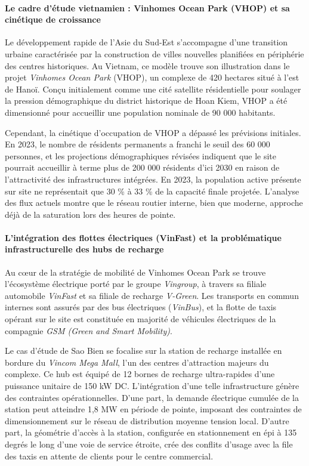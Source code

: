 \documentclass[10pt, a4paper]{article}
\begin{document}
\paragraph{Le cadre d'étude vietnamien : Vinhomes Ocean Park (VHOP) et
sa cinétique de
croissance}\label{le-cadre-duxe9tude-vietnamien-vinhomes-ocean-park-vhop-et-sa-cinuxe9tique-de-croissance}

Le développement rapide de l'Asie du Sud-Est s'accompagne d'une
transition urbaine caractérisée par la construction de villes nouvelles
planifiées en périphérie des centres historiques. Au Vietnam, ce modèle
trouve son illustration dans le projet \emph{Vinhomes Ocean Park}
(VHOP), un complexe de 420 hectares situé à l'est de Hanoï. Conçu
initialement comme une cité satellite résidentielle pour soulager la
pression démographique du district historique de Hoan Kiem, VHOP a été
dimensionné pour accueillir une population nominale de 90 000 habitants.

Cependant, la cinétique d'occupation de VHOP a dépassé les prévisions
initiales. En 2023, le nombre de résidents permanents a franchi le seuil
des 60 000 personnes, et les projections démographiques révisées
indiquent que le site pourrait accueillir à terme plus de 200 000
résidents d'ici 2030 en raison de l'attractivité des infrastructures
intégrées. En 2023, la population active présente sur site ne
représentait que 30 \% à 33 \% de la capacité finale projetée. L'analyse
des flux actuels montre que le réseau routier interne, bien que moderne,
approche déjà de la saturation lors des heures de pointe.

\paragraph{L'intégration des flottes électriques (VinFast) et la
problématique infrastructurelle des hubs de
recharge}\label{lintuxe9gration-des-flottes-uxe9lectriques-vinfast-et-la-probluxe9matique-infrastructurelle-des-hubs-de-recharge}

Au cœur de la stratégie de mobilité de Vinhomes Ocean Park se trouve
l'écosystème électrique porté par le groupe \emph{Vingroup}, à travers
sa filiale automobile \emph{VinFast} et sa filiale de recharge
\emph{V-Green}. Les transports en commun internes sont assurés par des
bus électriques (\emph{VinBus}), et la flotte de taxis opérant sur le
site est constituée en majorité de véhicules électriques de la compagnie
\emph{GSM (Green and Smart Mobility)}.

Le cas d'étude de Sao Bien se focalise sur la station de recharge
installée en bordure du \emph{Vincom Mega Mall}, l'un des centres
d'attraction majeurs du complexe. Ce hub est équipé de 12 bornes de
recharge ultra-rapides d'une puissance unitaire de 150 kW DC.
L'intégration d'une telle infrastructure génère des contraintes
opérationnelles. D'une part, la demande électrique cumulée de la station
peut atteindre 1,8 MW en période de pointe, imposant des contraintes de
dimensionnement sur le réseau de distribution moyenne tension local.
D'autre part, la géométrie d'accès à la station, configurée en
stationnement en épi à 135 degrés le long d'une voie de service étroite,
crée des conflits d'usage avec la file des taxis en attente de clients
pour le centre commercial.
\end{document}
